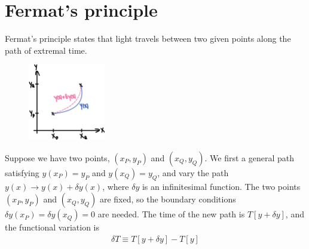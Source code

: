 \documentclass[12pt]{book} %
\numberwithin{equation}{chapter}
\def\d{\delta}
\begin{document}
\section{Fermat's principle}
Fermat's principle states that light travels between two given points along the path of extremal time.\\
\begin{figure}
\vspace{-0.5cm}
\centering
\includegraphics[width=0.3\textwidth]{Functional variation}
\end{figure}
Suppose we have two points, $(x_{P}, y_{P})$ and $(x_{Q}, y_{Q})$. We first a general path satisfying $y(x_{P})=y_{P}$ and $y(x_{Q})=y_{Q}$, and vary the path $y(x)\to y(x)+\d y(x)$, where $\d y$ is an infinitesimal function. The two points $(x_{P}, y_{P})$ and $(x_{Q}, y_{Q})$ are fixed, so the boundary conditions $\d y(x_{P})=\d y(x_{Q})=0$ are needed.\bigskip\newline
The time of the new path is $T[y+\d y]$, and the functional variation is
\begin{align*}
\d T\equiv T[y+\d y]-T[y]
\end{align*}
\end{document}
